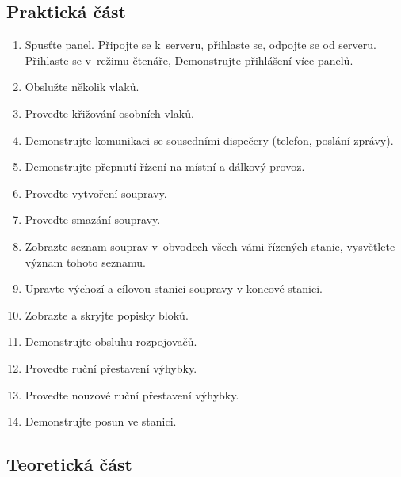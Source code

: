 \documentclass[12pt,a4paper]{article}
\begin{document}
\subsection*{Praktická část}

\begin{enumerate}[leftmargin=*]
\item Spusťte panel. Připojte se k~serveru, přihlaste se, odpojte se od
serveru. Přihlaste se v~režimu čtenáře, Demonstrujte přihlášení více panelů.
\item Obslužte několik vlaků.
\item Proveďte křižování osobních vlaků.
\item Demonstrujte komunikaci se sousedními dispečery (telefon, poslání zprávy).
\item Demonstrujte přepnutí řízení na místní a dálkový provoz.
\item Proveďte vytvoření soupravy.
\item Proveďte smazání soupravy.
\item Zobrazte seznam souprav v~obvodech všech vámi řízených stanic, vysvětlete
význam tohoto seznamu.
\item Upravte výchozí a cílovou stanici soupravy v koncové stanici.
\item Zobrazte a skryjte popisky bloků.
\item Demonstrujte obsluhu rozpojovačů.
\item Proveďte ruční přestavení výhybky.
\item Proveďte nouzové ruční přestavení výhybky.
\item Demonstrujte posun ve stanici.
\end{enumerate}

\subsection*{Teoretická část}
\end{document}
